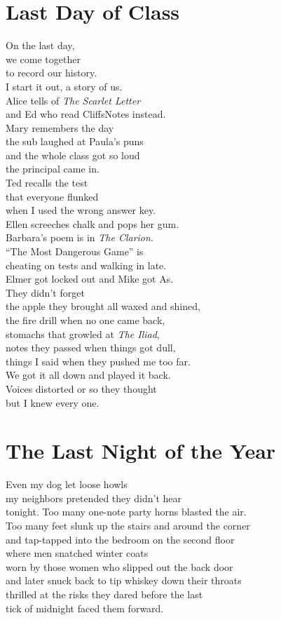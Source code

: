 \documentclass[twoside,10pt]{book}
\begin{document}
\clearpage
\section{Last Day of Class}

On the last day,\\
we come together\\
to record our history.\\
I start it out, a story of us.\\
Alice tells of \emph{The Scarlet Letter}\\
and Ed who read CliffsNotes instead.\\
Mary remembers the day\\
the sub laughed at Paula's puns\\
and the whole class got so loud\\
the principal came in.\\
Ted recalls the test\\
that everyone flunked\\
when I used the wrong answer key.\\
Ellen screeches chalk and pops her gum.\\
Barbara's poem is in \emph{The Clarion}.\\
``The Most Dangerous Game'' is\\
cheating on tests and walking in late.\\
Elmer got locked out and Mike got As.\\
They didn't forget\\
the apple they brought all waxed and shined,\\
the fire drill when no one came back,\\
stomachs that growled at \emph{The Iliad},\\
notes they passed when things got dull,\\
things I said when they pushed me too far.\\
We got it all down and played it back.\\
Voices distorted or so they thought\\
but I knew every one.


\clearpage
\section{The Last Night of the Year}

Even my dog let loose howls\\
my neighbors pretended they didn't hear\\
tonight. Too many one-note party horns blasted the air.\\
Too many feet slunk up the stairs and around the corner\\
and tap-tapped into the bedroom on the second floor\\
where men snatched winter coats\\
worn by those women who slipped out the back door\\
and later snuck back to tip whiskey down their throats\\
thrilled at the risks they dared before the last\\
tick of midnight faced them forward.
\end{document}
